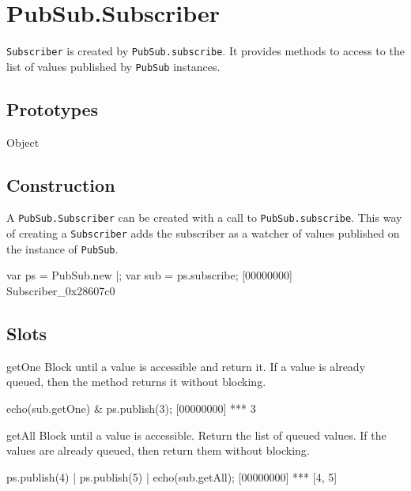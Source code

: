 \section{PubSub.Subscriber}

\lstinline|Subscriber| is created by \lstinline|PubSub.subscribe|.  It
provides methods to access to the list of values published by
\lstinline|PubSub| instances.

\subsection{Prototypes}

\begin{refObjects}
\item[Object]
\end{refObjects}

\subsection{Construction}

A \lstinline|PubSub.Subscriber| can be created with a call to
\lstinline|PubSub.subscribe|.  This way of creating a
\lstinline|Subscriber| adds the subscriber as a watcher of values
published on the instance of \lstinline|PubSub|.

\begin{urbiscript}[firstnumber=1]
var ps = PubSub.new |;
var sub = ps.subscribe;
[00000000] Subscriber_0x28607c0
\end{urbiscript}


\subsection{Slots}

\begin{urbiscriptapi}


\item[getOne]
  Block until a value is accessible and return it.  If a value is already
  queued, then the method returns it without blocking.

\begin{urbiscript}
echo(sub.getOne) &
ps.publish(3);
[00000000] *** 3
\end{urbiscript}


\item[getAll] Block until a value is accessible.  Return the list of
  queued values.  If the values are already queued, then return them
  without blocking.

\begin{urbiscript}
ps.publish(4) |
ps.publish(5) |
echo(sub.getAll);
[00000000] *** [4, 5]
\end{urbiscript}

\end{urbiscriptapi}

